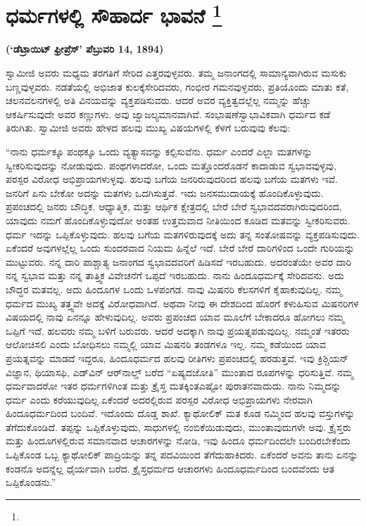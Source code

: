 
\chapter[ಧರ್ಮಗಳಲ್ಲಿ ಸೌಹಾರ್ದ ಭಾವನೆ ]{ಧರ್ಮಗಳಲ್ಲಿ ಸೌಹಾರ್ದ ಭಾವನೆ \protect\footnote{}}

\centerline{\textbf{(‘ಡೆಟ್ರಾಯಿಟ್​ ಫ್ರೀಪ್ರೆಸ್​’ ಪೆಬ್ರುವರಿ 14, 1894)}}

ಸ್ವಾಮೀಜಿ ಅವರು ಮಧ್ಯಮ ತರಗತಿಗೆ ಸೇರಿದ ಎತ್ತರವುಳ್ಳವರು. ತಮ್ಮ ಜನಾಂಗದಲ್ಲಿ ಸಾಮಾನ್ಯವಾಗಿರುವ ಮಸುಕು ಬಣ್ಣವುಳ್ಳವರು. ನಡತೆಯಲ್ಲಿ ಅಭಿಜಾತ ಕುಲಕ್ಕೆ\break ಸೇರಿದವರು, ಗಂಭೀರ ಗಮನವುಳ್ಳವರು, ಪ್ರತಿಯೊಂದು ಮಾತು ಕತೆ, ಚಲನವಲನಗಳಲ್ಲಿ ಅತಿ ವಿನಯವನ್ನು ವ್ಯಕ್ತಪಡಿಸುವರು. ಆದರೆ ಅವರ ವ್ಯಕ್ತಿತ್ವದಲ್ಲೆಲ್ಲ ನಮ್ಮನ್ನು ಹೆಚ್ಚು ಆಕರ್ಷಿಸುವುದೇ ಅವರ ಕಣ್ಣುಗಳು. ಅವು ಜ್ವಾಜಲ್ಯಮಾನವಾಗಿವೆ. ಸಂಭಾಷಣೆ\break ಸ್ವಾಭಾವಿಕವಾಗಿ ಧರ್ಮದ ಕಡೆ ತಿರುಗಿತು. ಸ್ವಾಮೀಜಿ ಅವರು ಹೇಳದ ಹಲವು ಮುಖ್ಯ ವಿಷಯಗಳಲ್ಲಿ ಕೆಳಗೆ ಬರುವುವು ಕೆಲವು:

“ನಾನು ಧರ್ಮಕ್ಕೂ ಪಂಥಕ್ಕೂ ಒಂದು ವ್ಯತ್ಯಾಸವನ್ನು ಕಲ್ಪಿಸುವೆನು. ಧರ್ಮ ಎಂದರೆ ಎಲ್ಲಾ ಮತಗಳನ್ನು ಸ್ವೀಕರಿಸುವುದನ್ನು ನೋಡುವುದು. ಪಂಥಗಳಾದರೋ, ಒಂದು ಮತ್ತೊಂದರೊಡನೆ ಕಾದಾಡುವ ಸ್ವಭಾವವುಳ್ಳವು, ಪರಸ್ಪರ ವಿರೋಧ ಅಭಿಪ್ರಾಯಗಳುಳ್ಳವು. ಹಲವು ಬಗೆಯ ಜನರಿರುವುದರಿಂದ ಹಲವು ಬಗೆಯ ಮತಗಳು ಇವೆ. ಜನರಿಗೆ ಏನು ಬೇಕೋ ಅದನ್ನು ಮತಗಳು ಒದಗಿಸುತ್ತವೆ. ಇದು ಜನಸಮುದಾಯಕ್ಕೆ ಹೊಂದಿಕೊಳ್ಳುವುದು. ಪ್ರಪಂಚದಲ್ಲಿ ಜನರು ಬೌದ್ಧಿಕ, ಆಧ್ಯಾತ್ಮಿಕ, ಮತ್ತು ಆರ್ಥಿಕ ಕ್ಷೇತ್ರದಲ್ಲಿ ಬೇರೆ ಬೇರೆ ಸ್ವಭಾವದವರಾಗಿರುವುದರಿಂದ, ಯಾವುದು ನಮಗೆ ಹೊಂದಿಕೊಳ್ಳುವುದೋ ಅಂತಹ ಉತ್ತಮವಾದ ನೀತಿಯಿಂದ ಕೂಡಿದ ಮತವನ್ನು ಸ್ವೀಕರಿಸುವರು. ಧರ್ಮ ಇದನ್ನು ಒಪ್ಪಿಕೊಳ್ಳುವುದು. ಹಲವು ಬಗೆಯ ಮತಗಳಿರುವುದಕ್ಕೆ ಅದು ತನ್ನ ಸಂತೋಷವನ್ನು ವ್ಯಕ್ತಪಡಿಸುವುದು. ಏಕೆಂದರೆ ಅವುಗಳಲ್ಲೆಲ್ಲ ಒಂದು ಸುಂದರವಾದ ನಿಯಮ ಹಿನ್ನೆಲೆ ಇದೆ. ಬೇರೆ ಬೇರೆ ದಾರಿಗಳಿಂದ ಒಂದೇ ಗುರಿಯನ್ನು ಮುಟ್ಟುವರು. ನನ್ನ ದಾರಿ ಪಾಶ್ಚಾತ್ಯ ಜನಾಂಗದ ಸ್ವಭಾವದವರಿಗೆ ಹಿಡಿಸದೆ ಇರಬಹುದು. ಅದರಂತೆಯೇ ಅವರ ದಾರಿ ನನ್ನ ಸ್ವಭಾವ ಮತ್ತು ನನ್ನ ತಾತ್ತ್ವಿಕ ವಿವೇಚನೆಗೆ ಒಪ್ಪದೆ ಇರಬಹುದು. ನಾನು ಹಿಂದೂಧರ್ಮಕ್ಕೆ ಸೇರಿದವನು. ಅದು ಬೌದ್ಧರ ಮತವಲ್ಲ. ಅದು ಹಿಂದೂಗಳ ಒಂದು ಒಳಪಂಗಡ. ನಾವು ಮಿಷನರಿ ಕೆಲಸಗಳಿಗೆ ಕೈಹಾಕುವುದಿಲ್ಲ. ನಮ್ಮ ಧರ್ಮದ ಮುಖ್ಯ ತತ್ತ್ವವೇ ಅದಕ್ಕೆ ವಿರೋಧವಾಗಿದೆ. ಅಥವಾ ನೀವು ಈ ದೇಶದಿಂದ ಹೊರಗೆ ಕಳುಹಿಸುವ ಮಿಷನರಿಗಳ ವಿಷಯದಲ್ಲಿ ನಾವು ಏನನ್ನೂ ಹೇಳುವುದಿಲ್ಲ. ಅವರು ಪ್ರಪಂಚದ ಯಾವ ಮೂಲೆಗೆ ಬೇಕಾದರೂ ಹೋಗಲು ನಮ್ಮ ಒಪ್ಪಿಗೆ ಇದೆ. ಹಲವರು ನಮ್ಮ ಬಳಿಗೆ ಬರುವರು. ಆದರೆ ಅದಕ್ಕಾಗಿ ನಾವು ಪ್ರಯತ್ನಪಡುವುದಿಲ್ಲ. ನಮ್ಮಂತೆ ಇತರರು ಆಲೋಚಿಸಲಿ ಎಂದು ಬೋಧಿಸಲು ನಮ್ಮಲ್ಲಿ ಯಾವ ಮಿಷನರಿ ತಂಡಗಳೂ ಇಲ್ಲ. ನಮ್ಮ ಕಡೆಯಿಂದ ಯಾವ ಪ್ರಯತ್ನವನ್ನು ಮಾಡದೆ ಇದ್ದರೂ, ಹಿಂದೂಧರ್ಮದ ಹಲವು ರೀತಿಗಳು ಪ್ರಪಂಚದಲ್ಲಿ ಹರಡುತ್ತವೆ. ಇವು ಕ್ರಿಶ್ಚಿಯನ್​ ವಿಜ್ಞಾನ, ಥಿಯಾಸಫಿ, ಎಡ್​ವಿನ್​ ಆರ್​ನಾಲ್ಡ್​ ಬರೆದ “ಏಷ್ಯದಜೋತಿ” ಮುಂತಾದ ರೂಪಗಳನ್ನು ಧರಿಸುತ್ತಿವೆ. ನಮ್ಮ ಧರ್ಮವಾದರೋ ಇತರ ಧರ್ಮಗಳಿಗಿಂತ ಮತ್ತು ಕ್ರೈಸ್ತ ಮತಕ್ಕಿಂತ\break ಎಷ್ಟೋ ಪುರಾತನವಾದುದು. ನಾನು ನಿಮ್ಮದನ್ನು ಧರ್ಮ ಎಂದು ಕರೆಯುವುದಿಲ್ಲ.\break ಏಕೆಂದರೆ ಅದರಲ್ಲಿರುವ ಪರಸ್ಪರ ವಿರೋಧ ಅಭಿಪ್ರಾಯಗಳು ನೇರವಾಗಿ ಹಿಂದೂಧರ್ಮದಿಂದ ಬಂದಿವೆ. ಇದೊಂದು ದೊಡ್ಡ ಶಾಖೆ. ಕ್ಯಾಥೋಲಿಕ್​ ಮತ ಕೂಡ ನಮ್ಮಿಂದ ಹಲವು ವಸ್ತುಗಳನ್ನು ತೆಗೆದುಕೊಂಡಿದೆ. ತಪ್ಪನ್ನು ಒಪ್ಪಿಕೊಳ್ಳುವುದು, ಸಾಧುಗಳಲ್ಲಿ ನಂಬಿಕೆಯಿಡುವುದು, ಮುಂತಾವುದುಗಳೇ ಅವು. ಕ್ರೈಸ್ತರು ಮತ್ತು ಹಿಂದೂಗಳಲ್ಲಿರುವ ಸಮಾನವಾದ ಆಚಾರಗಳನ್ನು ನೋಡಿ, ಇವು ಹಿಂದೂ ಧರ್ಮದಿಂದಲೇ ಬಂದಿರಬೇಕೆಂದು ಒಪ್ಪಿಕೊಂಡ ಒಬ್ಬ ಕ್ಯಾಥೋಲಿಕ್​ ಪಾದ್ರಿಯನ್ನು ತನ್ನ ಪದವಿಯಿಂದ ತೆಗೆದುಹಾಕಿದರು. ಏಕೆಂದರೆ ಅವನು ತಾನು ಏನನ್ನು ಕಂಡನೊ ಅದನ್ನೆಲ್ಲ ಧೈರ್ಯವಾಗಿ ಬರೆದ. ಕ್ರೈಸ್ತಧರ್ಮದ ಆಚಾರಗಳು ಹಿಂದೂಧರ್ಮದಿಂದ ಬಂದವೆಂದು ಆತ ಒಪ್ಪಿಕೊಂಡನು.”

